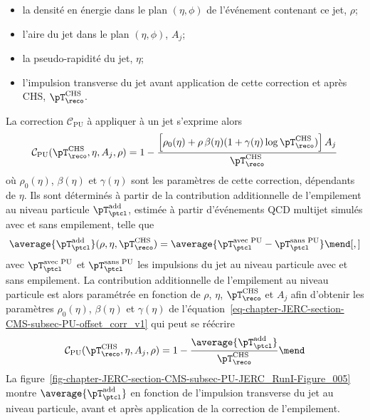 \begin{itemize}
\item la densité en énergie dans le plan $(\eta, \phi)$ de l'événement contenant ce jet, $\rho$;
\item l'aire du jet dans le plan $(\eta, \phi)$, $A_j$;
\item la pseudo-rapidité du jet, $\eta$;
\item l'impulsion transverse du jet avant application de cette correction et après CHS, $\pT_\reco^\text{CHS}$.
\end{itemize}
La correction $\mathcal{C}_\text{PU}$ à appliquer à un jet s'exprime alors
\begin{equation}
\mathcal{C}_\text{PU}(\pT_\reco^\text{CHS}, \eta, A_j, \rho)
= 1 - \frac{\left[\rho_0(\eta) + \rho\,\beta(\eta)(1+\gamma(\eta)\log\pT_\reco^\text{CHS})\right]A_j}{\pT_\reco^\text{CHS}}
\label{eq-chapter-JERC-section-CMS-subsec-PU-offset_corr_v1}
\end{equation}
où $\rho_0(\eta)$, $\beta(\eta)$ et $\gamma(\eta)$ sont les paramètres de cette correction, dépendants de $\eta$.
Ils sont déterminés à partir de la contribution additionnelle de l'empilement au niveau particule $\pT_\ptcl^\text{add}$, estimée à partir d'événements QCD multijet simulés avec et sans empilement, telle que
\begin{equation}
\average{\pT_\ptcl^\text{add}}(\rho, \eta, \pT_\reco^\text{CHS})
=
\average{\pT_\ptcl^\text{avec PU} - \pT_\ptcl^\text{sans PU}}
\mend[,]
\label{eq-chapter-JERC-section-CMS-subsec-PU-pTaddptcl}
\end{equation}
avec
$\pT_\ptcl^\text{avec PU}$ et $\pT_\ptcl^\text{sans PU}$
les impulsions du jet au niveau particule avec et sans empilement.
La contribution additionnelle de l'empilement au niveau particule est alors paramétrée en fonction de $\rho$, $\eta$, $\pT_\reco^\text{CHS}$ et $A_j$ afin d'obtenir les paramètres $\rho_0(\eta)$, $\beta(\eta)$ et $\gamma(\eta)$ de l'équation~\eqref{eq-chapter-JERC-section-CMS-subsec-PU-offset_corr_v1} qui peut se réécrire
\begin{equation}
\mathcal{C}_\text{PU}(\pT_\reco^\text{CHS}, \eta, A_j, \rho)
= 1 - \frac{\average{\pT_\ptcl^\text{add}}}{\pT_\reco^\text{CHS}}
\mend
\label{eq-chapter-JERC-section-CMS-subsec-PU-offset_corr_v2}
\end{equation}
La figure~\ref{fig-chapter-JERC-section-CMS-subsec-PU-JERC_RunI-Figure_005} montre $\average{\pT_\ptcl^\text{add}}$ en fonction de l'impulsion transverse du jet au niveau particule, avant et après application de la correction de l'empilement.
